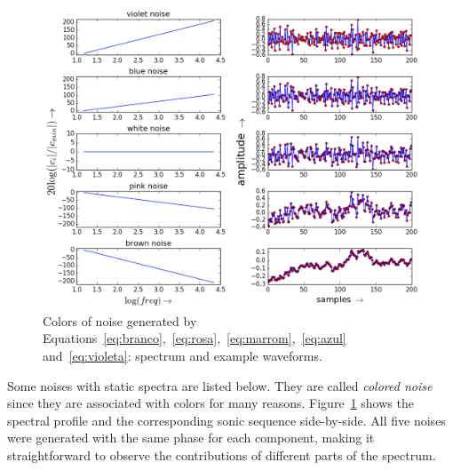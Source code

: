 \begin{figure}
	\hspace*{-.75cm}
         \includegraphics[width=1.\textwidth]{figures/ruidos_}
     \caption{Colors of noise generated by Equations~\ref{eq:branco},~\ref{eq:rosa},~\ref{eq:marrom},~\ref{eq:azul} and~\ref{eq:violeta}: spectrum and example waveforms.}
         \label{fig:ruidos}
\end{figure}

Some noises with static spectra are listed below. They are called \emph{colored noise} since they are associated with colors for many reasons.
Figure~\ref{fig:ruidos} shows the spectral profile and the corresponding sonic sequence side-by-side. All five noises were generated with the same phase for each component, making it straightforward to observe the contributions of different parts of the spectrum.

